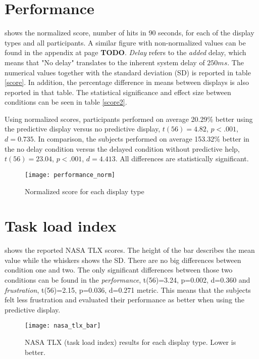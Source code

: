 \section{Performance}

 shows the normalized score, number of hits in 90 seconds, for each of the display types and all participants. A similar figure with non-normalized values can be found in the appendix at page \textbf{TODO}. \textit{Delay} refers to the \textit{added} delay, which means that "No delay" translates to the inherent system delay of $250 ms$. The numerical values together with the standard deviation (SD) is reported in table \ref{score}. In addition, the percentage difference in means between displays is also reported in that table. The statistical significance and effect size between conditions can be seen in table \ref{score2}.

Using normalized scores, participants performed on average 20.29\% better using the predictive display versus no predictive display, $t(56)=4.82$, $p<.001$, $d=0.735$. In comparison, the subjects performed on average 153.32\% better in the no delay condition versus the delayed condition without predictive help, $t(56)=23.04$, $p<.001$, $d=4.413$. All differences are statistically significant.


\begin{figure}[h!]
    \centering
    \texttt{[image: performance\_norm]}
    \caption{Normalized score for each display type}
    \label{performanceNorm}
\end{figure}





\section{Task load index}

 shows the reported NASA TLX scores. The height of the bar describes the mean value while the whiskers shows the SD. There are no big differences between condition one and two. The only significant differences between those two conditions can be found in the \emph{performance}, t(56)=3.24, p=0.002, d=0.360 and \emph{frustration}, t(56)=2.15, p=0.036, d=0.271 metric. This means that the subjects felt less frustration and evaluated their performance as better when using the predictive display.


\begin{figure}[h!]
    \centering
    \texttt{[image: nasa\_tlx\_bar]}
    \caption{NASA TLX (task load index) results for each display type. Lower is better.}
    \label{tlx}
\end{figure}

